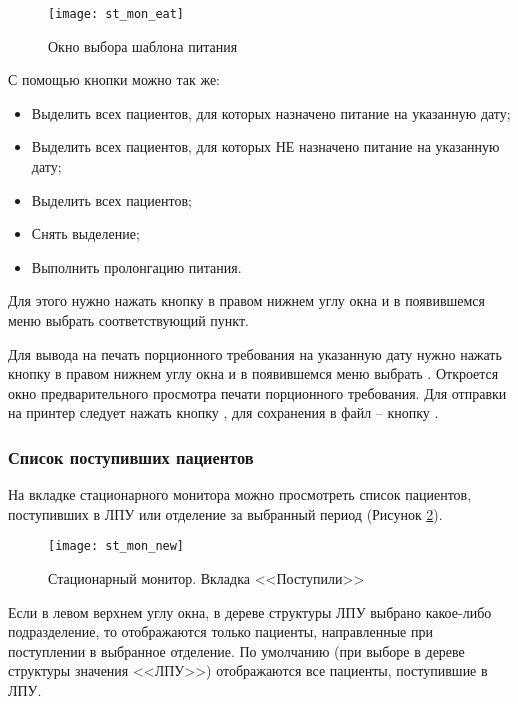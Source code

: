 \begin{figure}[ht]\centering
   \texttt{[image: st\_mon\_eat]}
   \caption{Окно выбора шаблона питания}
   \label{img_st_mon_eat}
\end{figure}

С помощью кнопки   можно так же:
\begin{itemize}
 \item Выделить всех пациентов, для которых назначено питание на указанную дату;
 \item Выделить всех пациентов, для которых НЕ назначено питание на указанную дату;
 \item Выделить всех пациентов;
 \item Снять выделение;
 \item Выполнить пролонгацию питания.
\end{itemize}
 
Для этого нужно нажать кнопку  в правом нижнем углу окна и в появившемся меню выбрать соответствующий пункт.

Для вывода на печать порционного требования на указанную дату нужно нажать кнопку   в правом нижнем углу окна и в появившемся меню выбрать . Откроется окно предварительного просмотра печати порционного требования. Для отправки на принтер следует нажать кнопку  , для сохранения в файл – кнопку .

\subsubsection{Список поступивших пациентов}

На вкладке  стационарного монитора можно просмотреть список пациентов, поступивших в ЛПУ или отделение за выбранный период (Рисунок \ref{img_st_mon_new}).

\begin{figure}[ht]\centering
   \texttt{[image: st\_mon\_new]}
   \caption{Стационарный монитор. Вкладка <<Поступили>>}
   \label{img_st_mon_new}
\end{figure}

Если в левом верхнем углу окна, в дереве структуры ЛПУ выбрано какое-либо подразделение, то отображаются только пациенты, направленные при поступлении в выбранное отделение. По умолчанию (при выборе в дереве структуры значения <<ЛПУ>>) отображаются все пациенты, поступившие в ЛПУ.

